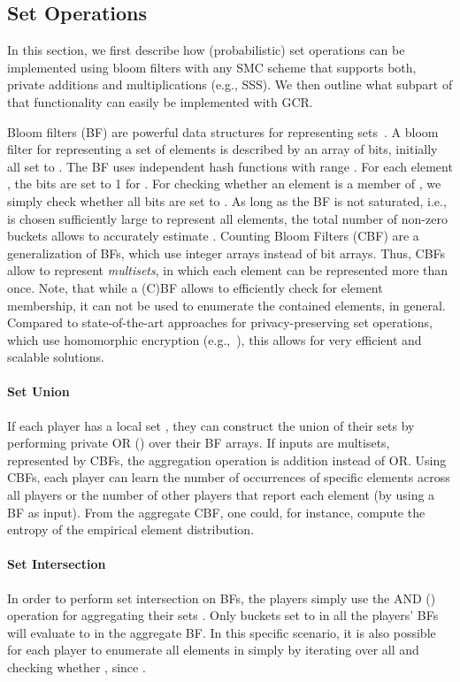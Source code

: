 \documentclass{sig-alternate}
\begin{document}
\subsection{Set Operations}\label{sec:setop}

In this section, we first describe how (probabilistic) set operations can be implemented using bloom filters with any SMC scheme that supports both, private additions and multiplications (e.g., SSS). 
We then outline what subpart of that functionality can easily be implemented with GCR. 

Bloom filters (BF) are powerful data structures for representing sets~\cite{broder2004network}. 
A bloom filter for representing a set  of  elements is described by an array
of  bits, initially all set to . The BF uses  independent hash functions
 with range . For each element ,
the bits  are set to 1 for .
For checking whether an element  is a member of , we simply check whether all bits  are set to .
As long as the BF is not saturated, i.e.,  is chosen sufficiently large to represent all elements, the total number of non-zero buckets allows to 
accurately estimate .
Counting Bloom Filters (CBF) are a generalization of BFs, which use integer arrays instead of bit arrays. Thus, CBFs allow to represent \emph{multisets}, in which each element can be represented more than once.
Note, that while a (C)BF allows to efficiently check for element membership, it can not be used to enumerate the contained elements, in general.
Compared to state-of-the-art approaches for privacy-preserving set operations, which use homomorphic encryption (e.g.,~\cite{kissner2005pps}), this allows for very efficient and scalable solutions.

\paragraph{Set Union}
If each player  has a local set , they can construct the union of their sets  by performing private OR () over their BF arrays. 
If inputs are multisets, represented by CBFs, the aggregation operation is addition instead of OR.
Using CBFs, each player can learn  the number of occurrences of specific elements across all players or the number of other players that report each element (by using a BF as input). From the aggregate CBF, one could, for instance, compute the entropy of the empirical element distribution.

\paragraph{Set Intersection}
In order to perform set intersection on BFs, the players simply use the AND () operation for aggregating their sets .
Only buckets set to  in all the players' BFs will evaluate to  in the aggregate BF. In this specific scenario, it is also possible for each player  to enumerate all elements in  simply by iterating over all  and checking whether , since .
\end{document}
